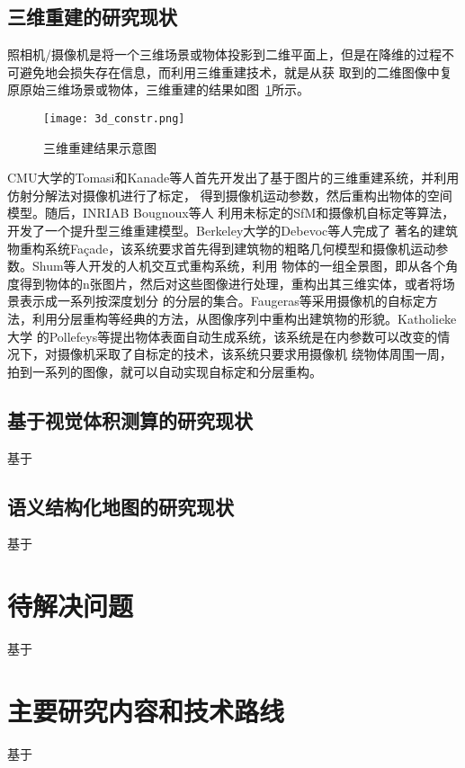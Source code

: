 \subsection{三维重建的研究现状}
\label{sec:1.2.2}
照相机/摄像机是将一个三维场景或物体投影到二维平面上，但是在降维的过程不可避免地会损失存在信息，而利用三维重建技术，就是从获
取到的二维图像中复原原始三维场景或物体，三维重建的结果如图~\ref{fig:3d_constr}所示。

\begin{figure}[H] %
    \centering
    \texttt{[image: 3d\_constr.png]}
    \caption{三维重建结果示意图}
    \label{fig:3d_constr}
  \end{figure}
  
CMU大学的Tomasi和Kanade\cite{tomasi1992shape}等人首先开发出了基于图片的三维重建系统，并利用仿射分解法对摄像机进行了标定，
得到摄像机运动参数，然后重构出物体的空间模型。随后，INRIAB Bougnoux等人\cite{bougnoux1997totalcalib,debevec1998image}
利用未标定的SfM和摄像机自标定等算法，开发了一个提升型三维重建模型。Berkeley大学的Debevoc\cite{beardsley19963d}等人完成了
著名的建筑物重构系统Façade，该系统要求首先得到建筑物的粗略几何模型和摄像机运动参数。Shum等人开发的人机交互式重构系统，利用
物体的一组全景图，即从各个角度得到物体的n张图片，然后对这些图像进行处理，重构出其三维实体，或者将场景表示成一系列按深度划分
的分层的集合。Faugeras等采用摄像机的自标定方法，利用分层重构等经典的方法，从图像序列中重构出建筑物的形貌。Katholieke大学
的Pollefeys等提出物体表面自动生成系统，该系统是在内参数可以改变的情况下，对摄像机采取了自标定的技术，该系统只要求用摄像机
绕物体周围一周，拍到一系列的图像，就可以自动实现自标定和分层重构。

\subsection{基于视觉体积测算的研究现状}
\label{sec:1.2.3}
基于
\subsection{语义结构化地图的研究现状}
\label{sec:1.2.4}
基于
\section{待解决问题}
\label{sec:1.3}
基于
\section{主要研究内容和技术路线}
\label{sec:1.4}
基于

